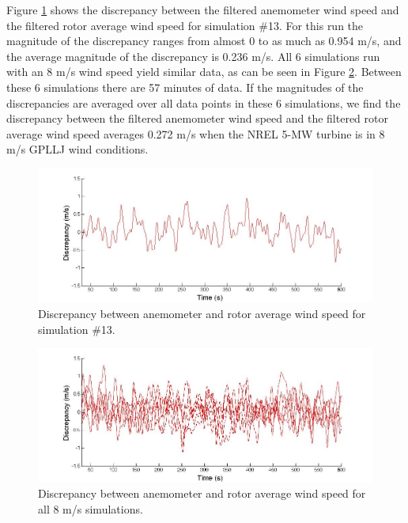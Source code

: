 Figure \ref{fig2-9} shows the discrepancy between the filtered anemometer wind speed and the filtered rotor average wind speed for simulation \#13. For this run the magnitude of the discrepancy ranges from almost 0 to as much as 0.954 m/s, and the average magnitude of the discrepancy is 0.236 m/s. All 6 simulations run with an 8 m/s wind speed yield similar data, as can be seen in Figure \ref{fig2-10}. Between these 6 simulations there are 57 minutes of data. If the magnitudes of the discrepancies are averaged over all data points in these 6 simulations, we find the discrepancy between the filtered anemometer wind speed and the filtered rotor average wind speed averages 0.272 m/s when the NREL 5-MW turbine is in 8 m/s GPLLJ wind conditions.

\begin{figure}[htbp]
	\centering
		\includegraphics[width = \linewidth]{Figures/ch2Figures/fig2-9.jpg}
		
	\caption{Discrepancy between anemometer and rotor average wind speed for simulation \#13.}
	\label{fig2-9}
\end{figure}

\begin{figure}[htbp]
	\centering
		\includegraphics[trim = {.25cm 0 2.5cm 0}, clip, width = .95\linewidth]{Figures/ch2Figures/fig2-10.jpg}
		
	\caption{Discrepancy between anemometer and rotor average wind speed for all 8 m/s simulations.}
	\label{fig2-10}
\end{figure}


